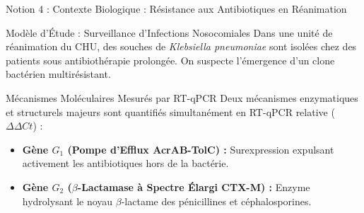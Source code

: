 \documentclass[aspectratio=169,10pt]{beamer}
\begin{document}
\begin{frame}{Notion 4 : Contexte Biologique : Résistance aux Antibiotiques en Réanimation}
  \begin{conceptbox}{Modèle d'Étude : Surveillance d'Infections Nosocomiales}
    \footnotesize
    Dans une unité de réanimation du CHU, des souches de \textit{Klebsiella pneumoniae} sont isolées chez des patients sous antibiothérapie prolongée. On suspecte l'émergence d'un clone bactérien multirésistant.
  \end{conceptbox}
  \vspace{1mm}
  \begin{biobox}{Mécanismes Moléculaires Mesurés par RT-qPCR}
    \footnotesize
    Deux mécanismes enzymatiques et structurels majeurs sont quantifiés simultanément en RT-qPCR relative ($\Delta\Delta Ct$) :
    \begin{itemize}
      \item \textbf{Gène $G_1$ (Pompe d'Efflux AcrAB-TolC) :} Surexpression expulsant activement les antibiotiques hors de la bactérie.
      \item \textbf{Gène $G_2$ ($\beta$-Lactamase à Spectre Élargi CTX-M) :} Enzyme hydrolysant le noyau $\beta$-lactame des pénicillines et céphalosporines.
    \end{itemize}
  \end{biobox}
\end{frame}
\end{document}
